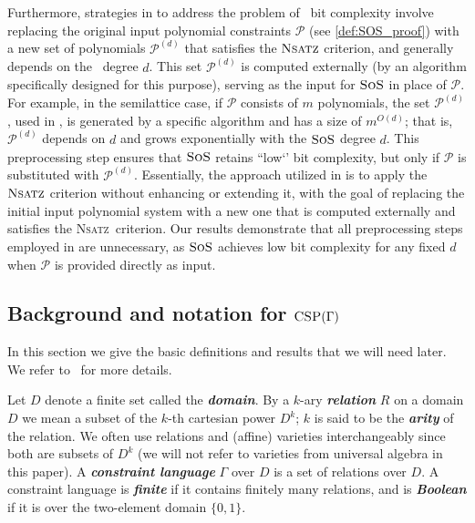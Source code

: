 \documentclass[11pt]{article}
\newcommand{\sos}{\text{\sc{SoS}}}
\newcommand{\CSP}{\textsc{CSP}}
\newcommand{\Nsatz}{\textsc{Nsatz}}
\newcommand{\1}{\textbf{1}}
\begin{document}
Furthermore, strategies in \cite{BharathiM21,BulatovRSTOC22,BulatovARXIV21, Mastrolilli21TALG} to address the problem of \sos\ bit complexity involve replacing the original input polynomial constraints \(\mathcal{P}\) (see \cref{def:SOS_proof}) with a new set of polynomials $\mathcal{P}^{(d)}$ that satisfies the \(\Nsatz\) criterion, and generally depends on the \sos\ degree \(d\). This set $\mathcal{P}^{(d)}$ is computed externally (by an algorithm specifically designed for this purpose), serving as the input for \(\sos\) in place of $\mathcal{P}$. For example, in the semilattice case, if $\mathcal{P}$ consists of $m$ polynomials, the set $\mathcal{P}^{(d)}$, used in \cite{BulatovRSTOC22,Mastrolilli21TALG}, is generated by a specific algorithm and has a size of \( m^{O(d)} \); that is, $\mathcal{P}^{(d)}$ depends on \( d \) and grows exponentially with the \(\sos\) degree \( d \). This preprocessing step ensures that \(\sos\) retains ``low`' bit complexity, but only if $\mathcal{P}$ is substituted with $\mathcal{P}^{(d)}$. Essentially, the approach utilized in \cite{BharathiM21,BulatovRSTOC22,BulatovARXIV21, Mastrolilli21TALG} is to apply the \(\Nsatz\) criterion without enhancing or extending it, with the goal of replacing the initial input polynomial system with a new one that is computed externally and satisfies the \Nsatz\ criterion.
%
Our results demonstrate that all preprocessing steps employed in \cite{BharathiM21,BulatovRSTOC22,Mastrolilli21TALG} are unnecessary, as \(\sos\) achieves low bit complexity for any fixed \( d \) when \(\mathcal{P}\) is provided directly as input.



\subsection[Background and notation for CSP's]{Background and notation for \(\CSP(\Gamma)\)}\label{sect:CSP_IMP_background}
In this section we give the basic definitions and results that we will need later.
We refer to~\cite{barto_et_al:DFU:2017:6959,2017dfu7,Chen09, Mastrolilli21TALG, BulatovRSTOC22} for more details.

Let $D$ denote a finite set called the  \textbf{\emph{domain}}.
By a $k$-ary \textbf{\emph{relation}} $R$ on a domain $D$ we mean a subset of the $k$-th cartesian power $D^k$; $k$ is said to be the \textbf{\emph{arity}} of the relation. We often use relations and (affine) varieties interchangeably since both are subsets of $D^k$ (we will not refer to varieties from universal algebra in this paper). A \textbf{\emph{constraint language}} $\Gamma$ over $D$ is a set of relations over $D$. A constraint language is \textbf{\emph{finite}} if it contains finitely many relations, and is \textbf{\emph{Boolean}} if it is over the two-element domain $\{0,1\}$. %
\end{document}
